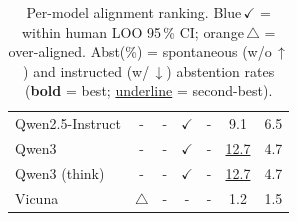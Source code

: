 \begin{table}[t]
\begin{tabular}{>{\raggedright\arraybackslash}p{2.6cm}cccccc}
\midrule
Qwen2.5-Instruct & - & - & \cellcolor[HTML]{D9EAF3}$\checkmark$ & - & 9.1 & 6.5 \\
Qwen3 & - & - & \cellcolor[HTML]{D9EAF3}$\checkmark$ & - & \underline{12.7} & 4.7 \\
Qwen3 (think) & - & - & \cellcolor[HTML]{D9EAF3}$\checkmark$ & - & \underline{12.7} & 4.7 \\
Vicuna & \cellcolor[HTML]{F7EBD9}$\triangle$ & - & - & - & 1.2 & 1.5 \\
\bottomrule
\end{tabular}
\caption{Per-model alignment ranking. \colorbox[HTML]{D9EAF3}{Blue}\,$\checkmark$ = within human LOO 95\,\% CI; \colorbox[HTML]{F7EBD9}{orange}\,$\triangle$ = over-aligned. Abst(\%) = spontaneous (w/o\,$\uparrow$) and instructed (w/\,$\downarrow$) abstention rates (\textbf{bold} = best; \underline{underline} = second-best).}
\label{tab:alignment_ranking_7b_ticks}
\end{table}
